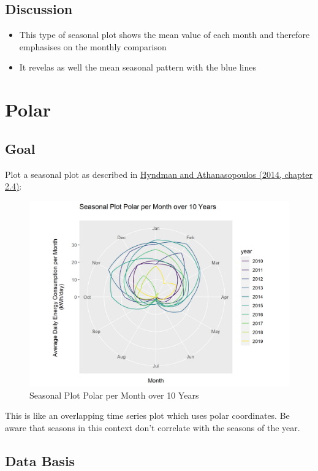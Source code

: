 \documentclass[
  a4paperpaper,
]{book}
\begin{document}
\hypertarget{discussion-2}{%
\subsection{Discussion}\label{discussion-2}}

\begin{itemize}
\item
  This type of seasonal plot shows the mean value of each month and therefore emphasises on the monthly comparison
\item
  It revelas as well the mean seasonal pattern with the blue lines
\end{itemize}

\newpage

\hypertarget{polar}{%
\section{Polar}\label{polar}}

\hypertarget{goal-8}{%
\subsection{Goal}\label{goal-8}}

Plot a seasonal plot as described in \href{https://otexts.com/fpp2/seasonal-plots.html}{Hyndman and Athanasopoulos (2014, chapter 2.4)}:

\begin{figure}
\includegraphics[width=0.7\linewidth]{images/plotSeasonalPolar} \caption{Seasonal Plot Polar per Month over 10 Years}\label{fig:unnamed-chunk-18}
\end{figure}

This is like an overlapping time series plot which uses polar coordinates. Be aware that seasons in this context don't correlate with the seasons of the year.

\hypertarget{data-basis-8}{%
\subsection{Data Basis}\label{data-basis-8}}
\end{document}
